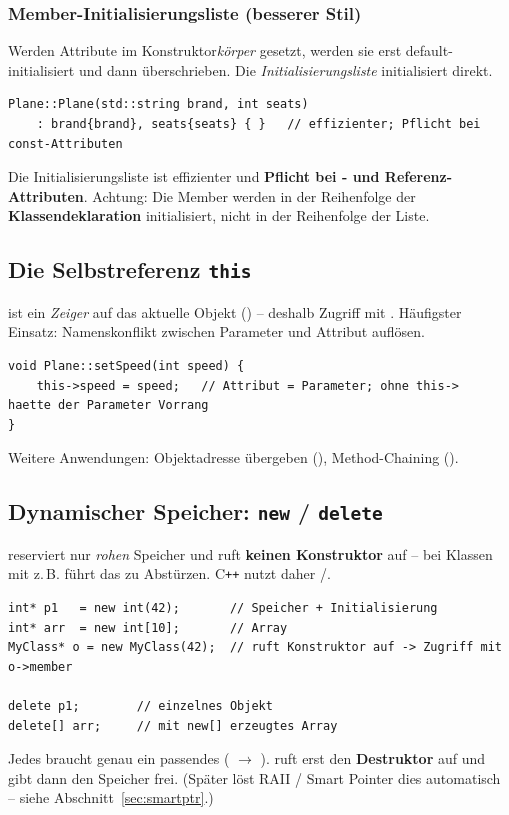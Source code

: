 \subsubsection{Member-Initialisierungsliste (besserer Stil)}
Werden Attribute im Konstruktor\emph{k\"orper} gesetzt, werden sie erst default-initialisiert und dann \"uberschrieben. Die \emph{Initialisierungsliste} initialisiert direkt.
\begin{syntaxbox}
\end{syntaxbox}
\begin{lstlisting}
Plane::Plane(std::string brand, int seats)
    : brand{brand}, seats{seats} { }   // effizienter; Pflicht bei const-Attributen
\end{lstlisting}
\begin{merke}
Die Initialisierungsliste ist effizienter und \textbf{Pflicht bei - und Referenz-Attributen}. Achtung: Die Member werden in der Reihenfolge der \textbf{Klassendeklaration} initialisiert, nicht in der Reihenfolge der Liste.
\end{merke}

\subsection{Die Selbstreferenz \texttt{this}}
 ist ein \emph{Zeiger} auf das aktuelle Objekt () -- deshalb Zugriff mit \code{->}. H\"aufigster Einsatz: Namenskonflikt zwischen Parameter und Attribut aufl\"osen.
\begin{lstlisting}
void Plane::setSpeed(int speed) {
    this->speed = speed;   // Attribut = Parameter; ohne this->  haette der Parameter Vorrang
}
\end{lstlisting}
Weitere Anwendungen: Objektadresse \"ubergeben (), Method-Chaining ().

\subsection{Dynamischer Speicher: \texttt{new} / \texttt{delete}}
 reserviert nur \emph{rohen} Speicher und ruft \textbf{keinen Konstruktor} auf -- bei Klassen mit z.\,B.  f\"uhrt das zu Abst\"urzen. C\texttt{++} nutzt daher /.
\begin{lstlisting}
int* p1   = new int(42);       // Speicher + Initialisierung
int* arr  = new int[10];       // Array
MyClass* o = new MyClass(42);  // ruft Konstruktor auf -> Zugriff mit o->member

delete p1;        // einzelnes Objekt
delete[] arr;     // mit new[] erzeugtes Array
\end{lstlisting}
\begin{merke}
Jedes  braucht genau ein passendes  ( $\to$ ).  ruft erst den \textbf{Destruktor} auf und gibt dann den Speicher frei. (Sp\"ater l\"ost RAII / Smart Pointer dies automatisch -- siehe Abschnitt~\ref{sec:smartptr}.)
\end{merke}

